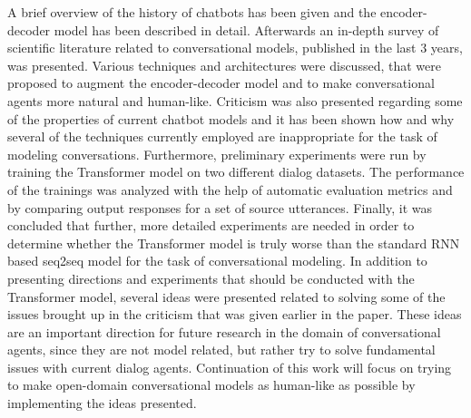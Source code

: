 \documentclass[12pt]{article}
\begin{document}
A brief overview of the history of chatbots has been given and the encoder-decoder model has been described in detail. Afterwards an in-depth survey of scientific literature related to conversational models, published in the last 3 years, was presented. Various techniques and architectures were discussed, that were proposed to augment the encoder-decoder model and to make conversational agents more natural and human-like. Criticism was also presented regarding some of the properties of current chatbot models and it has been shown how and why several of the techniques currently employed are inappropriate for the task of modeling conversations. Furthermore, preliminary experiments were run by training the Transformer model on two different dialog datasets. The performance of the trainings was analyzed with the help of automatic evaluation metrics and by comparing output responses for a set of source utterances. Finally, it was concluded that further, more detailed experiments are needed in order to determine whether the Transformer model is truly worse than the standard RNN based seq2seq model for the task of conversational modeling. In addition to presenting directions and experiments that should be conducted with the Transformer model, several ideas were presented related to solving some of the issues brought up in the criticism that was given earlier in the paper. These ideas are an important direction for future research in the domain of conversational agents, since they are not model related, but rather try to solve fundamental issues with current dialog agents. Continuation of this work will focus on trying to make open-domain conversational models as human-like as possible by implementing the ideas presented.



\newpage
\end{document}
